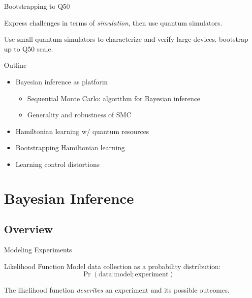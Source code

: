 \documentclass[xcolor=dvipsnames, compress]{beamer}
\begin{document}
\begin{frame}{Bootstrapping to Q50}

  Express challenges in terms of \emph{simulation}, then
  use \alert<2>{quantum simulators}.

  \begin{block}{}
    Use small quantum simulators to characterize and verify
    large devices, bootstrap up to Q50 scale.
  \end{block}

\end{frame}

\begin{frame}{Outline}

  \begin{itemize}[<+->]
    \item Bayesian inference as platform
    \begin{itemize}
      \item Sequential Monte Carlo: algorithm for Bayesian inference
      \item Generality and robustness of SMC
    \end{itemize}
    \item Hamiltonian learning w/ quantum resources
    \item Bootstrapping Hamiltonian learning
    \item Learning control distortions
  \end{itemize}

\end{frame}

\section[Bayes]{Bayesian Inference}
\subsection{Overview}

\begin{frame}{Modeling Experiments}

  \begin{block}{Likelihood Function}
  Model data collection as a probability distribution:
    $$\Pr(\text{data} | \text{model}; \text{experiment})$$
  \end{block}

  \pause

  The likelihood function \emph{describes} an experiment and its possible
  outcomes. 

\end{frame}
\end{document}
